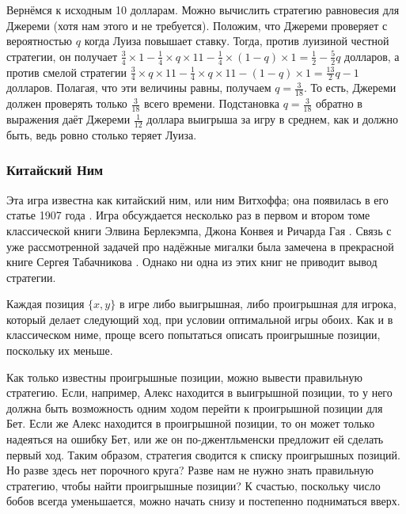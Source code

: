Вернёмся к исходным 10 долларам.
Можно вычислить стратегию равновесия для Джереми (хотя нам этого и не требуется).
Положим, что Джереми проверяет с вероятностью $q$ когда Луиза повышает ставку.
Тогда, против луизиной честной стратегии, он получает $\tfrac34 \times 1 - \tfrac14 \times q \times 11 - \tfrac14 \times (1 - q) \times 1 = \tfrac12 - \tfrac52q$ долларов,
а против смелой стратегии $\tfrac34 \times q \times 11 - \tfrac14 \times q \times 11 - (1 - q) \times 1 = \tfrac{13}2q - 1$ долларов.
Полагая, что эти величины равны, получаем $q = \tfrac3{18}$.
То есть, Джереми должен проверять только $\tfrac3{18}$ всего времени.
Подстановка $q = \tfrac3{18}$ обратно в выражения даёт Джереми $\tfrac1{12}$ доллара выигрыша за игру в среднем, как и должно быть, ведь ровно столько теряет Луиза.

\subsubsection*{Китайский Ним}

Эта игра известна как китайский ним, или ним  Витхоффа;
она появилась в его статье 1907 года \cite{60}.
Игра обсуждается несколько раз в первом и втором томе классической книги Элвина Берлекэмпа, Джона Конвея и Ричарда  Гая \cite{4}.
Связь с уже рассмотренной задачей про надёжные мигалки была замечена в прекрасной книге Сергея Табачникова \cite{56}.
Однако ни одна из этих книг не приводит вывод стратегии.

Каждая позиция $\{x, y\}$ в игре либо выигрышная, либо проигрышная для игрока, который делает следующий ход, при условии оптимальной игры обоих.
Как и в классическом ниме, проще всего попытаться описать проигрышные позиции, поскольку их меньше.

Как только известны проигрышные позиции, можно вывести правильную стратегию.
Если, например, Алекс находится в выигрышной позиции, то у него должна быть возможность одним ходом перейти к проигрышной позиции для Бет.
Если же Алекс находится в проигрышной позиции, то он может только надеяться на ошибку Бет, или же он по-джентльменски предложит ей сделать первый ход.
Таким образом, стратегия сводится к списку проигрышных позиций.
Но разве здесь нет порочного круга?
Разве нам не нужно знать правильную стратегию, чтобы найти проигрышные позиции?
К счастью, поскольку число бобов всегда уменьшается, можно начать снизу и постепенно подниматься вверх.

